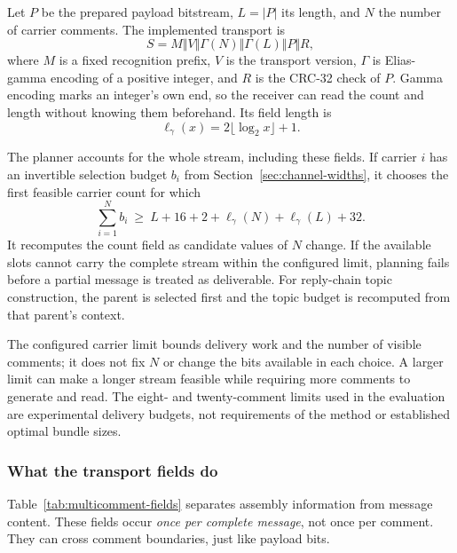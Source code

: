 Let $P$ be the prepared payload bitstream, $L=|P|$ its length, and $N$ the number of carrier comments. The implemented transport is
\[
S=M\Vert V\Vert\Gamma(N)\Vert\Gamma(L)\Vert P\Vert R,
\]
where $M$ is a fixed recognition prefix, $V$ is the transport version, $\Gamma$ is Elias-gamma encoding of a positive integer, and $R$ is the CRC-32 check of $P$. Gamma encoding marks an integer's own end, so the receiver can read the count and length without knowing them beforehand. Its field length is
\[
\ell_\gamma(x)=2\lfloor\log_2 x\rfloor+1.
\]

The planner accounts for the whole stream, including these fields. If carrier $i$ has an invertible selection budget $b_i$ from Section~\ref{sec:channel-widths}, it chooses the first feasible carrier count for which
\[
\sum_{i=1}^{N}b_i\ \ge\ L+16+2+\ell_\gamma(N)+\ell_\gamma(L)+32.
\]
It recomputes the count field as candidate values of $N$ change. If the available slots cannot carry the complete stream within the configured limit, planning fails before a partial message is treated as deliverable. For reply-chain topic construction, the parent is selected first and the topic budget is recomputed from that parent's context.

The configured carrier limit bounds delivery work and the number of visible comments; it does not fix $N$ or change the bits available in each choice. A larger limit can make a longer stream feasible while requiring more comments to generate and read. The eight- and twenty-comment limits used in the evaluation are experimental delivery budgets, not requirements of the method or established optimal bundle sizes.

\subsubsection{What the transport fields do}
\label{sec:multicomment-overhead}
Table~\ref{tab:multicomment-fields} separates assembly information from message content. These fields occur \emph{once per complete message}, not once per comment. They can cross comment boundaries, just like payload bits.

